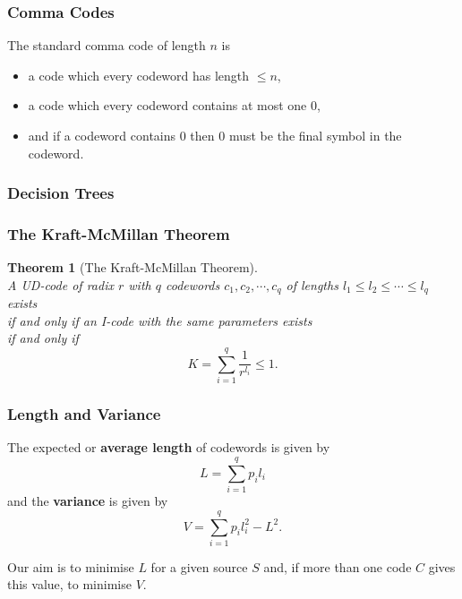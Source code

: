 \documentclass{article}
\newtheorem{theorem}{Theorem}[section]
\begin{document}
\subsubsection{Comma Codes}

The standard comma code of length $n$ is

\begin{itemize}
	\item a code which every codeword has length $\leq n$,
	\item a code which every codeword contains at most one $0$,
	\item and if a codeword contains $0$ then $0$ must be the final symbol in the codeword.
\end{itemize}

\subsubsection{Decision Trees}

\subsubsection{The Kraft-McMillan Theorem}

\begin{theorem}[The Kraft-McMillan Theorem]
	\mbox{}\\
	A UD-code of radix $r$ with $q$ codewords $c_{1}, c_{2},\cdots,c_{q}$ of lengths $l_{1} \leq l_{2} \leq \cdots \leq l_{q}$ exists \\
	if and only if \qquad an I-code with the same parameters exists \\
	if and only if
	\[K=\sum_{i=1}^{q}\frac{1}{r^{l_{i}}}\leq1. \]
\end{theorem}

\subsubsection{Length and Variance}

The expected or \textbf{average length} of codewords is given by
	\[L=\sum_{i=1}^{q}p_{i}l_{i}\]
	and the \textbf{variance} is given by
	\[V=\sum_{i=1}^{q}p_{i}l_{i}^{2}-L^{2}.\]

Our aim is to minimise $L$ for a given source $S$ and, if more than one code $C$ gives this value, to minimise $V$.
\end{document}
